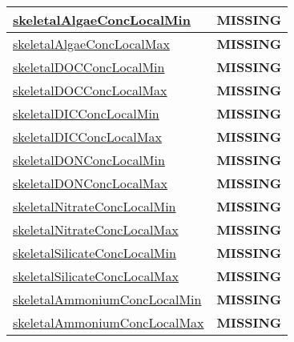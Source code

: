 {\begin{center}
\begin{longtable}{| p{2.0in} | p{4.0in} |}
    \hline
    \hyperref[subsec:var_sec_tracer_monotonicity_skeletalAlgaeConcLocalMin]{skeletalAlgaeConcLocalMin} & {\bf \color{red} MISSING} \\
    \hline
    \hyperref[subsec:var_sec_tracer_monotonicity_skeletalAlgaeConcLocalMax]{skeletalAlgaeConcLocalMax} & {\bf \color{red} MISSING} \\
    \hline
    \hyperref[subsec:var_sec_tracer_monotonicity_skeletalDOCConcLocalMin]{skeletalDOCConcLocalMin} & {\bf \color{red} MISSING} \\
    \hline
    \hyperref[subsec:var_sec_tracer_monotonicity_skeletalDOCConcLocalMax]{skeletalDOCConcLocalMax} & {\bf \color{red} MISSING} \\
    \hline
    \hyperref[subsec:var_sec_tracer_monotonicity_skeletalDICConcLocalMin]{skeletalDICConcLocalMin} & {\bf \color{red} MISSING} \\
    \hline
    \hyperref[subsec:var_sec_tracer_monotonicity_skeletalDICConcLocalMax]{skeletalDICConcLocalMax} & {\bf \color{red} MISSING} \\
    \hline
    \hyperref[subsec:var_sec_tracer_monotonicity_skeletalDONConcLocalMin]{skeletalDONConcLocalMin} & {\bf \color{red} MISSING} \\
    \hline
    \hyperref[subsec:var_sec_tracer_monotonicity_skeletalDONConcLocalMax]{skeletalDONConcLocalMax} & {\bf \color{red} MISSING} \\
    \hline
    \hyperref[subsec:var_sec_tracer_monotonicity_skeletalNitrateConcLocalMin]{skeletalNitrateConcLocalMin} & {\bf \color{red} MISSING} \\
    \hline
    \hyperref[subsec:var_sec_tracer_monotonicity_skeletalNitrateConcLocalMax]{skeletalNitrateConcLocalMax} & {\bf \color{red} MISSING} \\
    \hline
    \hyperref[subsec:var_sec_tracer_monotonicity_skeletalSilicateConcLocalMin]{skeletalSilicateConcLocalMin} & {\bf \color{red} MISSING} \\
    \hline
    \hyperref[subsec:var_sec_tracer_monotonicity_skeletalSilicateConcLocalMax]{skeletalSilicateConcLocalMax} & {\bf \color{red} MISSING} \\
    \hline
    \hyperref[subsec:var_sec_tracer_monotonicity_skeletalAmmoniumConcLocalMin]{skeletalAmmoniumConcLocalMin} & {\bf \color{red} MISSING} \\
    \hline
    \hyperref[subsec:var_sec_tracer_monotonicity_skeletalAmmoniumConcLocalMax]{skeletalAmmoniumConcLocalMax} & {\bf \color{red} MISSING} \\
    \hline

\end{longtable}
\end{center}}
